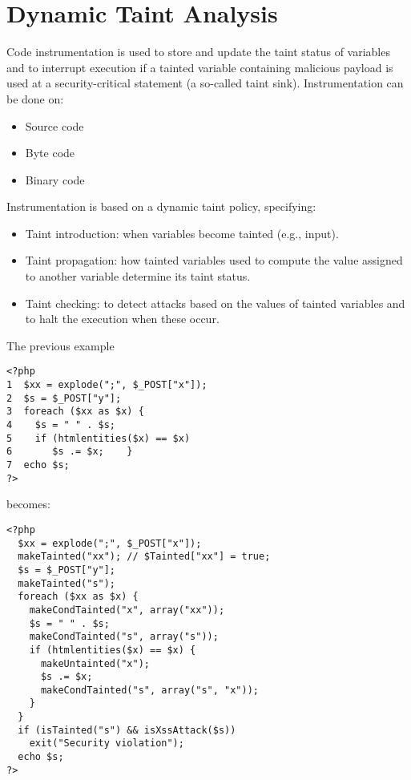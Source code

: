 \documentclass[a4paper, 10pt, titlepage]{article}
\begin{document}
\section{Dynamic Taint Analysis}
Code instrumentation is used to store and update the taint status of variables and to interrupt execution if a tainted variable containing malicious payload is used at a security-critical statement (a so-called taint sink).
Instrumentation can be done on:
\begin{itemize}
\item Source code
\item Byte code
\item Binary code
\end{itemize}
Instrumentation is based on a dynamic taint policy, specifying:
\begin{itemize}
\item Taint introduction: when variables become tainted (e.g., input).
\item Taint propagation: how tainted variables used to compute the value assigned to another variable determine its taint status.
\item Taint checking: to detect attacks based on the values of tainted variables and to halt the execution when these occur.
\end{itemize}
The previous example
\begin{lstlisting}
<?php 
1  $xx = explode(";", $_POST["x"]); 
2  $s = $_POST["y"]; 
3  foreach ($xx as $x) { 
4    $s = " " . $s; 
5    if (htmlentities($x) == $x) 
6       $s .= $x;    } 
7  echo $s; 
?>
\end{lstlisting}
becomes:
\begin{small}
\begin{lstlisting}
<?php
  $xx = explode(";", $_POST["x"]);
  makeTainted("xx"); // $Tainted["xx"] = true;
  $s = $_POST["y"];
  makeTainted("s");
  foreach ($xx as $x) {
    makeCondTainted("x", array("xx"));
    $s = " " . $s;
    makeCondTainted("s", array("s"));
    if (htmlentities($x) == $x) {
      makeUntainted("x");
      $s .= $x;
      makeCondTainted("s", array("s", "x"));
    }
  }
  if (isTainted("s") && isXssAttack($s))
    exit("Security violation");
  echo $s;
?>
\end{lstlisting}
\end{small}
\end{document}

